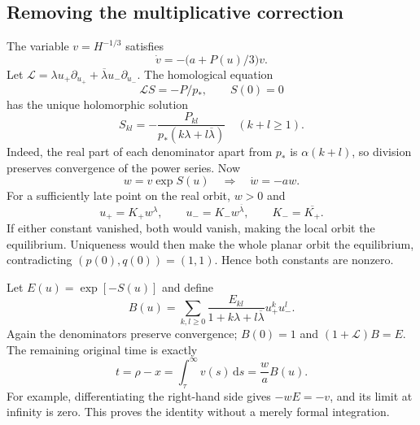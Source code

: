 \documentclass[11pt]{article}
\theoremstyle{remark}\newtheorem{remark}[theorem]{Remark}
\newcommand{\dd}{\,\mathrm d}
\newcommand{\la}{\lambda}
\newcommand{\lab}{{\overline{\lambda}}}
\numberwithin{equation}{section}
\begin{document}
\subsection{Removing the multiplicative correction}
The variable $v=H^{-1/3}$ satisfies
\begin{equation}\label{his:eq:vdot}
 \dot v=-\bigl(a+P(u)/3\bigr)v.
\end{equation}
Let $\mathcal L=\la u_+\partial_{u_+}+\lab u_-\partial_{u_-}$. The homological equation
\begin{equation}\label{his:eq:S}
 \mathcal L S=-P/p_*,\qquad S(0)=0
\end{equation}
has the unique holomorphic solution
\[
 S_{kl}=-\frac{P_{kl}}{p_*(k\la+l\lab)}\quad(k+l\ge1).
\]
Indeed, the real part of each denominator apart from $p_*$ is $\alpha(k+l)$, so division preserves convergence of the power series. Now
\begin{equation}\label{his:eq:w}
 w=v\exp S(u)\quad\Longrightarrow\quad \dot w=-aw.
\end{equation}
For a sufficiently late point on the real orbit, $w>0$ and
\begin{equation}\label{his:eq:constants}
 u_+=K_+w^\la,\qquad u_-=K_-w^\lab,\qquad K_- =\overline{K_+}.
\end{equation}
If either constant vanished, both would vanish, making the local orbit the equilibrium. Uniqueness would then make the whole planar orbit the equilibrium, contradicting $(p(0),q(0))=(1,1)$. Hence both constants are nonzero.

Let $E(u)=\exp[-S(u)]$ and define
\begin{equation}\label{his:eq:Btime}
 B(u)=\sum_{k,l\ge0}\frac{E_{kl}}{1+k\la+l\lab}u_+^ku_-^l.
\end{equation}
Again the denominators preserve convergence; $B(0)=1$ and $(1+\mathcal L)B=E$. The remaining original time is exactly
\begin{equation}\label{his:eq:time-exact}
 t=\rho-x=\int_\tau^\infty v(s)\dd s=\frac{w}{a}B(u).
\end{equation}
For example, differentiating the right-hand side gives $-wE=-v$, and its limit at infinity is zero. This proves the identity without a merely formal integration.
\end{document}
